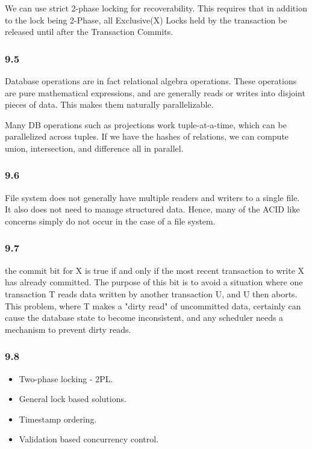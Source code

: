 \documentclass{article}
\begin{document}
We can use strict 2-phase locking for recoverability. This requires that
in addition to the lock being 2-Phase, all Exclusive(X) Locks held by the
transaction be released until after the Transaction Commits.

\subsubsection{9.5}
Database operations are in fact relational algebra operations. These
operations are pure mathematical expressions, and are generally reads or
writes into disjoint pieces of data. This makes them naturally parallelizable.

Many DB operations such as projections work tuple-at-a-time, which can be
parallelized across tuples. If we have the hashes of relations, we can
compute union, intersection, and difference all in parallel.


\subsubsection{9.6}
File system does not generally have multiple readers and writers to a single
file. It also does not need to manage structured data. Hence, many of the ACID
like concerns simply do not occur in the case of a file system.

\subsubsection{9.7}
the commit bit for X is true if and only if the most recent
transaction to write X has already committed. The purpose of this bit
is to avoid a situation where one transaction T reads data written by
another transaction U, and U then aborts. This problem, where T makes
a "dirty read" of uncommitted data, certainly can cause the database
state to become inconsistent, and any scheduler needs a mechanism to
prevent dirty reads.

\subsubsection{9.8}
\begin{itemize}
        \item  Two-phase locking - 2PL.
        \item General lock based solutions.
        \item Timestamp ordering.
        \item Validation based concurrency control.
\end{itemize}
\end{document}
